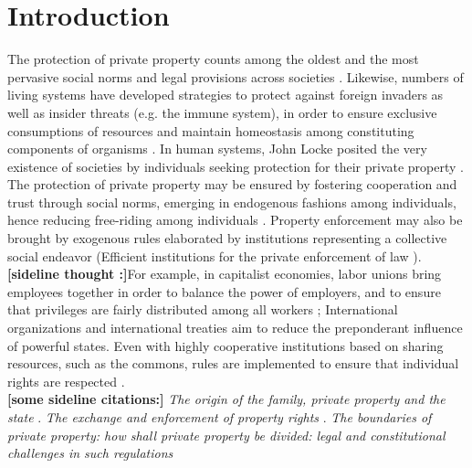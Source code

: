 \section*{Introduction}
The protection of private property counts among the oldest \cite{benson1989enforcement} and the most pervasive social norms and legal provisions across societies \cite{sened1997political}. Likewise, numbers of living systems have developed strategies to protect against foreign invaders as well as insider threats (e.g. the immune system), in order to ensure exclusive consumptions of resources and maintain homeostasis among constituting components of organisms \cite{}. In human systems, John Locke posited the very existence of societies by individuals seeking protection for their private property \cite{locke2014second}. The protection of private property may be ensured by fostering cooperation and trust through social norms, emerging in endogenous fashions among individuals, hence reducing free-riding among individuals \cite{}. Property enforcement may also be brought by exogenous rules elaborated by institutions representing a collective social endeavor (Efficient institutions for the private enforcement of law \cite{friedman1984efficient}).\\


{\bf[sideline thought :]}For example, in capitalist economies, labor unions bring employees together in order to balance the power of employers, and to ensure that privileges are fairly distributed among all workers \cite{}; International organizations and international treaties aim to reduce the preponderant influence of powerful states. Even with highly cooperative institutions based on sharing resources, such as the commons, rules are implemented to ensure that individual rights are respected \cite{ostrom1990governing}. \\

{\bf [some sideline citations:]}
{\it The origin of the family, private property and the state} \cite{engels1978origin}. {\it The exchange and enforcement of property rights} \cite{demsetz1964exchange}. {\it The boundaries of private property: how shall private property be divided: legal and constitutional challenges in such regulations} \cite{heller1999boundaries}\\

